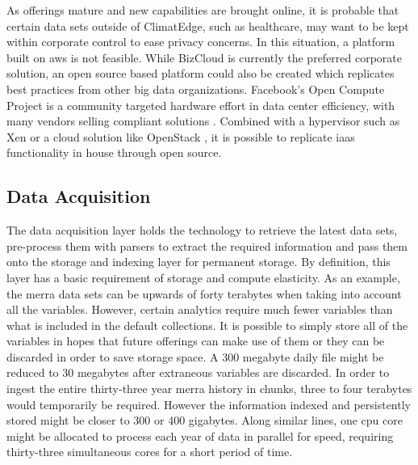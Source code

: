 As offerings mature and new capabilities are brought online, it is probable that certain data sets outside of ClimatEdge, such as healthcare, may want to be kept within corporate control to ease privacy concerns. In this situation, a platform built on \gls{aws} is not feasible. While BizCloud is currently the preferred corporate solution, an open source based platform could also be created which replicates best practices from other big data organizations. Facebook's Open Compute Project is a community targeted hardware effort in data center efficiency, with many vendors selling compliant solutions \cite{opencompute}. Combined with a hypervisor such as Xen \cite{xen} or a cloud solution like OpenStack \cite{openstack}, it is possible to replicate \gls{iaas} functionality in house through open source.
\subsection{Data Acquisition}
The data acquisition layer holds the technology to retrieve the latest data sets, pre-process them with parsers  to extract the required information and pass them onto the storage and indexing layer for permanent storage. By definition, this layer has a basic requirement of storage and compute elasticity. As an example, the \gls{merra} data sets can be upwards of forty terabytes when taking into account all the variables. However, certain analytics require much fewer variables than what is included in the default collections. It is possible to simply store all of the variables in hopes that future offerings can make use of them or they can be discarded in order to save storage space. A 300 megabyte daily file might be reduced to 30 megabytes after extraneous variables are discarded. In order to ingest the entire thirty-three year \gls{merra} history in chunks, three to four terabytes would  temporarily be required. However the information indexed and persistently stored might be closer to 300 or 400 gigabytes. Along similar lines, one \gls{cpu} core might be allocated to process each year of data in parallel for speed, requiring thirty-three simultaneous cores for a short period of time. \\

